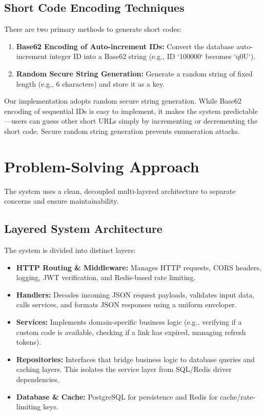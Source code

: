 \subsection{Short Code Encoding Techniques}
There are two primary methods to generate short codes:
\begin{enumerate}
    \item \textbf{Base62 Encoding of Auto-increment IDs:} Convert the database auto-increment integer ID into a Base62 string (e.g., ID `100000` becomes `q0U`). 
    \item \textbf{Random Secure String Generation:} Generate a random string of fixed length (e.g., 6 characters) and store it as a key.
\end{enumerate}
Our implementation adopts random secure string generation. While Base62 encoding of sequential IDs is easy to implement, it makes the system predictable—users can guess other short URLs simply by incrementing or decrementing the short code. Secure random string generation prevents enumeration attacks.

\section{Problem-Solving Approach}
The system uses a clean, decoupled multi-layered architecture to separate concerns and ensure maintainability.

\subsection{Layered System Architecture}
The system is divided into distinct layers:
\begin{itemize}
    \item \textbf{HTTP Routing \& Middleware:} Manages HTTP requests, CORS headers, logging, JWT verification, and Redis-based rate limiting.
    \item \textbf{Handlers:} Decodes incoming JSON request payloads, validates input data, calls services, and formats JSON responses using a uniform enveloper.
    \item \textbf{Services:} Implements domain-specific business logic (e.g., verifying if a custom code is available, checking if a link has expired, managing refresh tokens).
    \item \textbf{Repositories:} Interfaces that bridge business logic to database queries and caching layers. This isolates the service layer from SQL/Redis driver dependencies.
    \item \textbf{Database \& Cache:} PostgreSQL for persistence and Redis for cache/rate-limiting keys.
\end{itemize}

